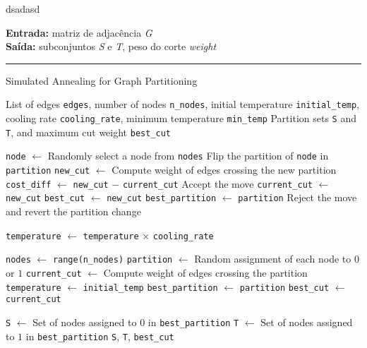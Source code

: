 \documentclass[mirror, portugues]{revdetua}
\begin{document}
dsadasd

\begin{algorithm}[H]
\raggedright
\textbf{Entrada:} matriz de adjacência \textit{G} \\
\textbf{Saída:} subconjuntos \textit{S} e \textit{T}, peso do corte \textit{weight} \\
\hrule 
\caption{Simulated Annealing for Graph Partitioning}
\begin{algorithmic}[1]

    \Require List of edges \texttt{edges}, number of nodes \texttt{n\_nodes}, initial temperature \texttt{initial\_temp}, cooling rate \texttt{cooling\_rate}, minimum temperature \texttt{min\_temp}
    \Ensure Partition sets \texttt{S} and \texttt{T}, and maximum cut weight \texttt{best\_cut}


        \State \texttt{node} $\gets$ Randomly select a node from \texttt{nodes}
        \State Flip the partition of \texttt{node} in \texttt{partition}
        \State \texttt{new\_cut} $\gets$ Compute weight of edges crossing the new partition
        \State \texttt{cost\_diff} $\gets$ \texttt{new\_cut} $-$ \texttt{current\_cut}
            \State Accept the move
            \State \texttt{current\_cut} $\gets$ \texttt{new\_cut}
                \State \texttt{best\_cut} $\gets$ \texttt{new\_cut}
                \State \texttt{best\_partition} $\gets$ \texttt{partition}
            \EndIf
        \Else
            \State Reject the move \\
            \State and revert the partition change
        \EndIf
        
        
        \State \texttt{temperature} $\gets$ \texttt{temperature} \ensuremath{\times} \texttt{cooling\_rate}
    \EndWhile

    \State \texttt{nodes} $\gets$ \texttt{range(n\_nodes)}
    \State \texttt{partition} $\gets$ Random assignment of each node to $0$ or $1$
    \State \texttt{current\_cut} $\gets$ Compute weight of edges crossing the partition
    \State \texttt{temperature} $\gets$ \texttt{initial\_temp}
    \State \texttt{best\_partition} $\gets$ \texttt{partition}
    \State \texttt{best\_cut} $\gets$ \texttt{current\_cut}

    \State \texttt{S} $\gets$ Set of nodes assigned to $0$ in \texttt{best\_partition}
    \State \texttt{T} $\gets$ Set of nodes assigned to $1$ in \texttt{best\_partition}
    \Return \texttt{S}, \texttt{T}, \texttt{best\_cut}
\end{algorithmic}
\end{algorithm}
\end{document}
